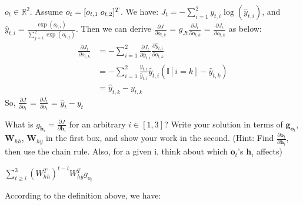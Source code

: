 \documentclass[11pt,addpoints,answers]{exam}
\newcommand{\gv}{\mathbf{g}}
\newcommand{\hv}{\mathbf{h}}
\newcommand{\ov}{\mathbf{o}}
\newcommand{\Wv}{\mathbf{W}}
\begin{document}
\begin{questions}
\begin{parts}
\begin{subparts}
\begin{subsubparts}
    \begin{your_solution}[title=Work,height=6cm,width=14cm]
    \small
    $o_t \in \mathbb{R}^2$. Assume $o_t = [o_{t,1} \hspace{1mm} o_{t,2}]^T$. We have: $J_t = -\sum_{i=1}^{2} y_{t,i} \log(\hat{y}_{t,i})$, and $\hat{y}_{t,i} = \frac{\exp(o_{t,i})}{\sum_{j=1}^{2} \exp(o_{t,j})}$. Then we can derive $\frac{\partial J}{\partial o_{t,k}}$ = $g_{Jt}$$\frac{\partial J_{t}}{\partial o_{t,k}}$ = $\frac{\partial J_{t}}{\partial o_{t,k}}$ as below:\\
    \[
    \begin{aligned}
    	\frac{\partial J_t}{\partial o_{t,k}} &= -\sum_{i=1}^{2} \frac{\partial J_t}{\partial \hat{y}_{t,i}} \frac{\partial \hat{y}_{t,i}}{\partial o_{t,k}}    \\&= -\sum_{i=1}^{2} \frac{y_{t,i}}{\hat{y}_{t,i}} \hat{y}_{t, i} (\mathbb{I}[i = k] - \hat{y}_{t, k})
    	                                    \\&= \hat{y}_{t, k} - y_{t,k}
    \end{aligned}
    \]
    So, $\frac{\partial J}{\partial o_{t}}$ = $\frac{\partial J_t}{\partial o_{t}}$ = $\hat{y}_{t} - y_{t}$
    \end{your_solution}

\clearpage
    \subsubpart[2] What is $g_{\hv_i} = \frac{\partial J}{\partial \hv_i}$ for an arbitrary $i \in [1,3]$? Write your solution in terms of $\gv_{\ov_t}$, $\Wv_{hh}$, $\Wv_{hy}$ in the first box, and show your work in the second. (Hint: Find $\frac{\partial \ov_t}{\partial \hv_i}$, then use the chain rule. Also, for a given i, think about which $\ov_t$'s  $\hv_i$ affects)
        
    \begin{your_solution}[title=$\frac{\partial J}{\partial \hv_i}$,height=2.5cm,width=8.5cm]
    $\sum_{t \geq i}^{3} \left(W_{hh}^T\right)^{t-i} W_{hy}^T g_{o_t}$
    \end{your_solution}
    
    \begin{your_solution}[title=Work,height=6cm,width=14cm]
    \tiny
    According to the definition above, we have:
    

\end{your_solution}
\end{subsubparts}
\end{subparts}
\end{parts}
\end{questions}
\end{document}

